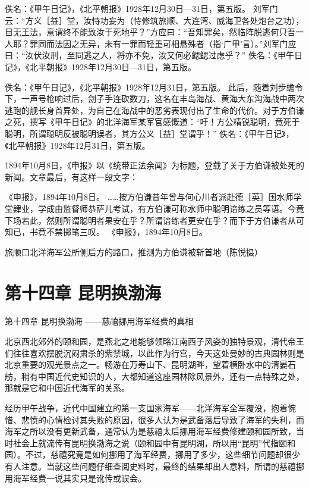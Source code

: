 \documentclass[12pt,UTF8]{ctexbook}
\begin{document}
佚名：《甲午日记》，《北平朝报》1928年12月30日—31日，第五版。
刘军门云：“方义［益］堂，汝恃功妄为（恃修筑旅顺、大连湾、威海卫各处炮台之功），目无王法，意谓终不能致汝于死地乎？”方应曰：“吾知罪矣，然临阵脱逃何只吾一人耶？罪同而法因之无异，未有一罪而轻重可相悬殊者（指‘广甲’言）。”刘军门应曰：“汝伏汝刑，至同逃之人，将亦不免，汝又何必鳃鳃过虑乎？” 佚名：《甲午日记》，《北平朝报》1928年12月30日—31日，第五版。

佚名：《甲午日记》，《北平朝报》1928年12月31日，第五版。
此后，随着刘步蟾令下，一声号枪响过后，刽子手连砍数刀，这名在丰岛海战、黄海大东沟海战中两次逃跑的舰长身首异处，为自己在海战中的恶劣表现付出了生命的代价。对于方伯谦之死，撰写《甲午日记》的北洋海军某军官感慨道：“吁！方公精锐聪明，竟死于聪明，所谓聪明反被聪明误者，其方公义［益］堂谓乎！” 佚名：《甲午日记》，《北平朝报》1928年12月31日，第五版。

1894年10月8日，《申报》以《统带正法余闻》为标题，登载了关于方伯谦被处死的新闻。文章最后，有这样一段文字：

《申报》，1894年10月8日。
……按方伯谦昔年曾与何心川者派赴德［英］国水师学堂肄业，学成由监督师恭萨儿考试，有方伯谦可称水师中聪明谙练之员等语。今竟下场若此，然则所谓聪明者果安在乎？所谓谙练者更安在乎？而下于方伯谦者从可知已，书竟不禁掷笔三叹。 《申报》，1894年10月8日。


旅顺口北洋海军公所侧后方的路口，推测为方伯谦被斩首地（陈悦摄）

\chapter{第十四章 昆明换渤海}

第十四章
昆明换渤海
——慈禧挪用海军经费的真相

北京西北郊外的颐和园，是燕北之地能够领略江南西子风姿的独特景观，清代帝王们往往喜欢摆脱沉闷肃杀的紫禁城，以此作为行宫，今天这处曼妙的古典园林则是北京重要的观光景点之一。畅游在万寿山下、昆明湖畔，望着横卧水中的清晏石舫，稍有中国近代史知识的人，大都知道这座园林除风景外，还有一点特殊之处，那就是它和中国近代海军的关系。

经历甲午战争，近代中国建立的第一支国家海军——北洋海军全军覆没，抱着惋惜、悲愤的心情检讨其失败的原因，很多人认为是武备落后导致了海军的失利，而海军之所以没有更新武备，通常认为是慈禧太后挪用海军经费修建颐和园所致，当时社会上就流传有昆明换渤海之说（颐和园中有昆明湖，所以用“昆明”代指颐和园）。不过，慈禧究竟是如何挪用了海军经费，挪用了多少，这些细节问题却很少有人注意。当就这些问题仔细查阅史料时，最终的结果却出人意料，所谓的慈禧挪用海军经费一说其实只是讹传或误会。
\end{document}
